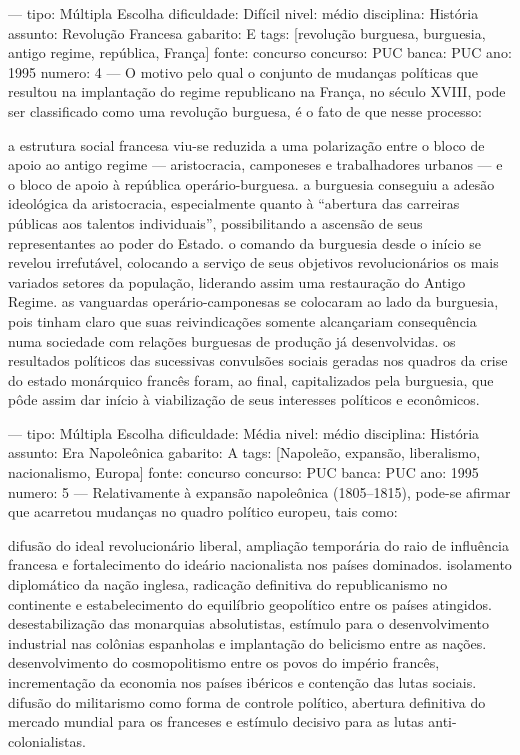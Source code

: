 ---
tipo: Múltipla Escolha
dificuldade: Difícil
nivel: médio
disciplina: História
assunto: Revolução Francesa
gabarito: E
tags: [revolução burguesa, burguesia, antigo regime, república, França]
fonte: concurso
concurso: PUC
banca: PUC
ano: 1995
numero: 4
---
\question
O motivo pelo qual o conjunto de mudanças políticas que resultou na implantação do regime republicano na França, no século XVIII, pode ser classificado como uma revolução burguesa, é o fato de que nesse processo:
\begin{choices}
\choice a estrutura social francesa viu-se reduzida a uma polarização entre o bloco de apoio ao antigo regime --- aristocracia, camponeses e trabalhadores urbanos --- e o bloco de apoio à república operário-burguesa.
\choice a burguesia conseguiu a adesão ideológica da aristocracia, especialmente quanto à ``abertura das carreiras públicas aos talentos individuais'', possibilitando a ascensão de seus representantes ao poder do Estado.
\choice o comando da burguesia desde o início se revelou irrefutável, colocando a serviço de seus objetivos revolucionários os mais variados setores da população, liderando assim uma restauração do Antigo Regime.
\choice as vanguardas operário-camponesas se colocaram ao lado da burguesia, pois tinham claro que suas reivindicações somente alcançariam consequência numa sociedade com relações burguesas de produção já desenvolvidas.
\CorrectChoice os resultados políticos das sucessivas convulsões sociais geradas nos quadros da crise do estado monárquico francês foram, ao final, capitalizados pela burguesia, que pôde assim dar início à viabilização de seus interesses políticos e econômicos.
\end{choices}

---
tipo: Múltipla Escolha
dificuldade: Média
nivel: médio
disciplina: História
assunto: Era Napoleônica
gabarito: A
tags: [Napoleão, expansão, liberalismo, nacionalismo, Europa]
fonte: concurso
concurso: PUC
banca: PUC
ano: 1995
numero: 5
---
\question
Relativamente à expansão napoleônica (1805--1815), pode-se afirmar que acarretou mudanças no quadro político europeu, tais como:
\begin{choices}
\CorrectChoice difusão do ideal revolucionário liberal, ampliação temporária do raio de influência francesa e fortalecimento do ideário nacionalista nos países dominados.
\choice isolamento diplomático da nação inglesa, radicação definitiva do republicanismo no continente e estabelecimento do equilíbrio geopolítico entre os países atingidos.
\choice desestabilização das monarquias absolutistas, estímulo para o desenvolvimento industrial nas colônias espanholas e implantação do belicismo entre as nações.
\choice desenvolvimento do cosmopolitismo entre os povos do império francês, incrementação da economia nos países ibéricos e contenção das lutas sociais.
\choice difusão do militarismo como forma de controle político, abertura definitiva do mercado mundial para os franceses e estímulo decisivo para as lutas anti-colonialistas.
\end{choices}

